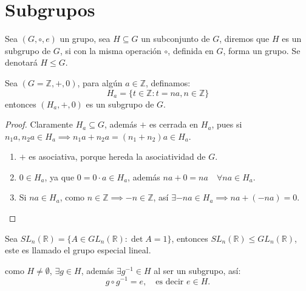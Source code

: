 \section{Subgrupos}%
\label{sec:Subgrupos}

\begin{defi}[Subgrupo]
	Sea $(G, \circ, e)$ un grupo, sea $H \subseteq G$ un subconjunto de $G$, diremos que $H$ es un subgrupo de $G$, si con la misma operación $\circ$, definida en $G$, forma un grupo. Se denotará $H \le G$.
\end{defi}

\begin{eje}
	Sea $(G=\mathbb{Z}, +, 0)$, para algún $a \in \mathbb{Z}$, definamos:
	\begin{equation*}
		H_a = \{ t \in \mathbb{Z} : t = na, n \in \mathbb{Z} \}
	\end{equation*}
	entonces $(H_a, +, 0)$ es un subgrupo de $G$.
\end{eje}

\begin{proof}
	Claramente $H_a \subseteq G$, además $+$ es cerrada en $H_a$, pues si $n_1 a, n_2 a \in H_a \implies n_1 a + n_2 a = (n_1+n_2)a \in H_a$.

	\begin{enumerate}[label=\roman*), font=\normalfont]
		\item $+$ es asociativa, porque hereda la asociatividad de $G$.
		\item $0 \in H_a$, ya que $0 = 0 \cdot a \in H_a$, además $na + 0 = na \quad \forall na \in H_a$.
		\item Si $na \in H_a$, como $n \in \mathbb{Z} \implies -n \in \mathbb{Z}$, así $\exists -na \in H_a \implies na + (-na) = 0$.
	\end{enumerate}
\end{proof}

\begin{eje}
	Sea $SL_n(\mathbb{R}) = \{ A \in GL_n(\mathbb{R}) : \det A = 1 \}$, entonces $SL_n(\mathbb{R}) \le GL_n(\mathbb{R})$, este es llamado el grupo especial lineal.
\end{eje}


\begin{enefecto}
	como $H \neq \emptyset$, $\exists g \in H$, además $\exists g^{-1} \in H$ al ser un subgrupo, así:
	\begin{equation*}
		g \circ g^{-1} = e, \quad \text{es decir } e \in H.
	\end{equation*}
\end{enefecto}


